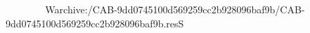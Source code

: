           
                                                     W   archive:/CAB-9dd0745100d569259cc2b928096baf9b/CAB-9dd0745100d569259cc2b928096baf9b.resS 